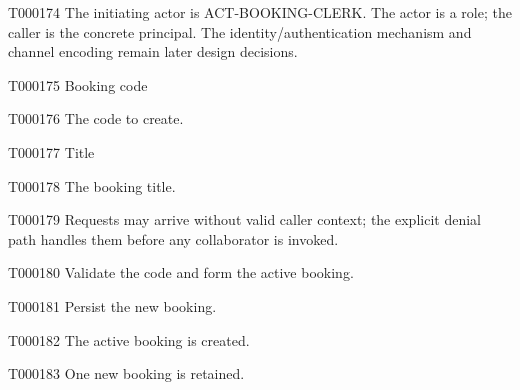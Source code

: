 \documentclass[11pt,a4paper]{article}
\begin{document}
\begin{atlasparagraph}{T000174}
The initiating actor is ACT-BOOKING-CLERK. The actor is a role; the caller is the concrete principal. The identity/authentication mechanism and channel encoding remain later design decisions.
\end{atlasparagraph}
\begin{atlastext}{T000175}
Booking code
\end{atlastext}
\begin{atlasparagraph}{T000176}
The code to create.
\end{atlasparagraph}
\begin{atlastext}{T000177}
Title
\end{atlastext}
\begin{atlasparagraph}{T000178}
The booking title.
\end{atlasparagraph}
\begin{atlasparagraph}{T000179}
Requests may arrive without valid caller context; the explicit denial path handles them before any collaborator is invoked.
\end{atlasparagraph}
\begin{atlasparagraph}{T000180}
Validate the code and form the active booking.
\end{atlasparagraph}
\begin{atlasparagraph}{T000181}
Persist the new booking.
\end{atlasparagraph}
\begin{atlasparagraph}{T000182}
The active booking is created.
\end{atlasparagraph}
\begin{atlasparagraph}{T000183}
One new booking is retained.
\end{atlasparagraph}
\end{document}

